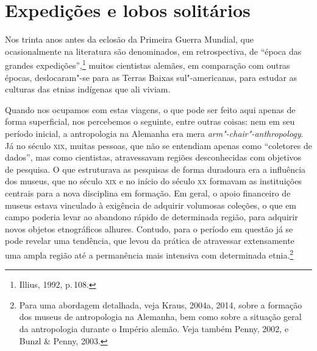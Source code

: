 \section{Expedições e lobos solitários}
Nos trinta anos antes da eclosão da Primeira Guerra Mundial, que
ocasionalmente na literatura são denominados, em retrospectiva, de
``época das grandes expedições'',\footnote{Illius, 1992, p.\,108.} muitos
cientistas alemães, em comparação com outras épocas, deslocaram"-se para
as Terras Baixas sul"-americanas, para estudar as culturas das etnias
indígenas que ali viviam.

Quando nos ocupamos com estas viagens, o que pode ser feito aqui apenas
de forma superficial, nos percebemos o seguinte, entre outras coisas:
nem em seu período inicial, a antropologia na Alemanha era mera
\textit{arm"-chair"-anthropology}. Já no século \textsc{xix}, muitas pessoas, que não
se entendiam apenas como ``coletores de dados'', mas como cientistas,
atravessavam regiões desconhecidas com objetivos de pesquisa. O que
estruturava as pesquisas de forma duradoura era a influência dos
museus, que no século \textsc{xix} e no início do século \textsc{xx} formavam as
instituições centrais para a nova disciplina em formação. Em geral, o
apoio financeiro de museus estava vinculado à exigência de adquirir
volumosas coleções, o que em campo poderia levar ao abandono rápido de
determinada região, para adquirir novos objetos etnográficos alhures.
Contudo, para o período em questão já se pode revelar uma tendência, que
levou da prática de atravessar extensamente uma ampla região até a
permanência mais intensiva com determinada etnia.\footnote{Para uma
  abordagem detalhada, veja Kraus, 2004a, 2014, sobre a formação dos
  museus de antropologia na Alemanha, bem como sobre a situação geral
  da antropologia durante o Império alemão. Veja também Penny, 2002, e
  Bunzl \& Penny, 2003.}

